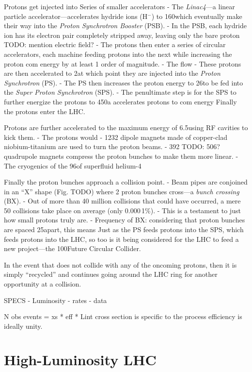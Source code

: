Protons get injected into Series of smaller accelerators
    - The \emph{Linac4}---a linear particle accelerator---accelerates hydride ions (H$^-$) to 160\MeV which eventually make their way into the \emph{Proton Synchrotron Booster} (PSB).
    - In the PSB, each hydride ion has its electron pair completely stripped away, leaving only the bare proton TODO: mention electric field?
    - The protons then enter a series of circular accelerators, each machine feeding protons into the next while increasing the proton com energy by at least 1 order of magnitude.
    - The flow 
    - These protons are then accelerated to 2\GeV at which point they are injected into the \emph{Proton Synchrotron} (PS).
    - The PS then increases the proton energy to 26\GeV to be fed into the \emph{Super Proton Synchrotron} (SPS).
    - The penultimate step is for the SPS to further energize the protons to 450\GeV a accelerates protons to com energy
Finally the protons enter the LHC.

Protons are further accelerated to the maximum energy of 6.5\TeV using RF cavities to kick them.
- The protons would 
- 1232 dipole magnets made of copper-clad niobium-titanium are used to turn the proton beams.
- 392 TODO: 506? quadrupole magnets compress the proton bunches to make them more linear.
- The cryogenics of the 96\tonne of superfluid helium-4

Finally the proton bunches approach a collision point.
- Beam pipes are conjoined in an ``X'' shape (Fig. TODO) where 2 proton bunches cross---a \emph{bunch crossing} (BX).
- Out of more than 40 million \pp collisions that could have occurred, a mere 50 collisions take place on average (\ie only 0.000\,1\%).
    - This is a testament to just how small protons truly are.
- Frequency of BX: considering that proton bunches are spaced 25\ns apart, this means 
Just as the PS feeds protons into the SPS, which feeds protons into the LHC, so too is it being considered for the LHC to feed a new project---the 100\Km Future Circular Collider.

In the event that \pname does not collide with any of the oncoming protons, then it is simply ``recycled'' and continues going around the LHC ring for another opportunity at a \pp collision.


SPECS
- Luminosity
- rates
- data

N obs events = xs * eff * Lint 
cross section is specific to the process
efficiency is ideally unity.

\section{High-Luminosity LHC}




